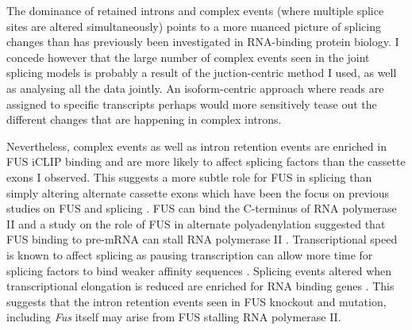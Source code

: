 The dominance of retained introns and complex events (where multiple splice sites are altered simultaneously) points to a more nuanced picture of splicing changes than has previously been investigated in RNA-binding protein biology.
I concede however that the large number of complex events seen in the joint splicing models is probably a result of the juction-centric method I used, as well as analysing all the data jointly. 
An isoform-centric approach where reads are assigned to specific transcripts \citep{Trapnell2010,Bray2016} perhaps would more sensitively tease out the different changes that are happening in complex introns.


Nevertheless, complex events as well as intron retention events are enriched in FUS iCLIP binding and are more likely to affect splicing factors than the cassette exons I observed. 
This suggests a more subtle role for FUS in splicing than simply altering alternate cassette exons which have been the focus on previous studies on FUS and splicing \citep{Rogelj2012,Lagier-Tourenne2012,Ishigaki2012,Honda2014,Scekic-zahirovic2016}.
FUS can bind the C-terminus of RNA polymerase II \citep{Schwartz2012} and a study on the role of FUS in alternate polyadenylation suggested that FUS binding to pre-mRNA can stall RNA polymerase II \citep{Masuda2015a}. 
Transcriptional speed is known to affect splicing as pausing transcription can allow more time for splicing factors to bind weaker affinity sequences \citep{Kornblihtt2004a}. 
Splicing events altered when transcriptional elongation is reduced are enriched for RNA binding genes \citep{Ip2011}. 
This suggests that the intron retention events seen in FUS knockout and mutation, including \textit{Fus} itself may arise from FUS stalling RNA polymerase II.

